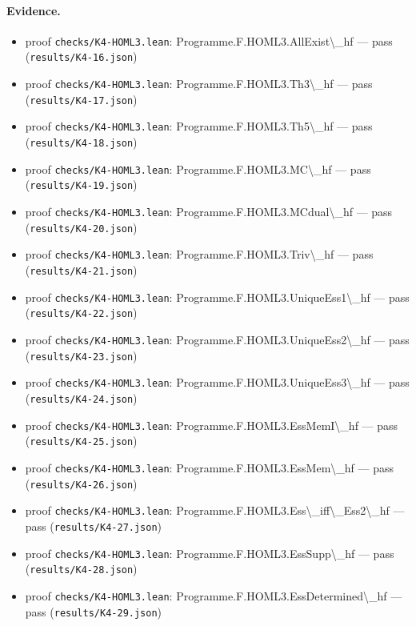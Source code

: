 \documentclass{article}
\begin{document}
\paragraph{Evidence.}
\begin{itemize}
\item proof \texttt{checks/K4-HOML3.lean}: Programme.F.HOML3.AllExist\textbackslash{}\_hf --- pass (\texttt{results/K4-16.json})
\item proof \texttt{checks/K4-HOML3.lean}: Programme.F.HOML3.Th3\textbackslash{}\_hf --- pass (\texttt{results/K4-17.json})
\item proof \texttt{checks/K4-HOML3.lean}: Programme.F.HOML3.Th5\textbackslash{}\_hf --- pass (\texttt{results/K4-18.json})
\item proof \texttt{checks/K4-HOML3.lean}: Programme.F.HOML3.MC\textbackslash{}\_hf --- pass (\texttt{results/K4-19.json})
\item proof \texttt{checks/K4-HOML3.lean}: Programme.F.HOML3.MCdual\textbackslash{}\_hf --- pass (\texttt{results/K4-20.json})
\item proof \texttt{checks/K4-HOML3.lean}: Programme.F.HOML3.Triv\textbackslash{}\_hf --- pass (\texttt{results/K4-21.json})
\item proof \texttt{checks/K4-HOML3.lean}: Programme.F.HOML3.UniqueEss1\textbackslash{}\_hf --- pass (\texttt{results/K4-22.json})
\item proof \texttt{checks/K4-HOML3.lean}: Programme.F.HOML3.UniqueEss2\textbackslash{}\_hf --- pass (\texttt{results/K4-23.json})
\item proof \texttt{checks/K4-HOML3.lean}: Programme.F.HOML3.UniqueEss3\textbackslash{}\_hf --- pass (\texttt{results/K4-24.json})
\item proof \texttt{checks/K4-HOML3.lean}: Programme.F.HOML3.EssMemI\textbackslash{}\_hf --- pass (\texttt{results/K4-25.json})
\item proof \texttt{checks/K4-HOML3.lean}: Programme.F.HOML3.EssMem\textbackslash{}\_hf --- pass (\texttt{results/K4-26.json})
\item proof \texttt{checks/K4-HOML3.lean}: Programme.F.HOML3.Ess\textbackslash{}\_iff\textbackslash{}\_Ess2\textbackslash{}\_hf --- pass (\texttt{results/K4-27.json})
\item proof \texttt{checks/K4-HOML3.lean}: Programme.F.HOML3.EssSupp\textbackslash{}\_hf --- pass (\texttt{results/K4-28.json})
\item proof \texttt{checks/K4-HOML3.lean}: Programme.F.HOML3.EssDetermined\textbackslash{}\_hf --- pass (\texttt{results/K4-29.json})
\end{itemize}
\end{document}
